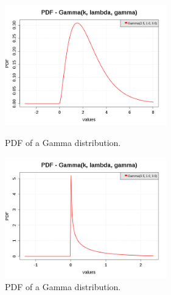 \begin{figure}[H]
  \begin{minipage}{10cm}
    \begin{center}
      \includegraphics[width=7cm]{pdf_Gamma_2.png}
      \caption{PDF of a Gamma distribution.}
      \label{PDFGamma2}
    \end{center}
  \end{minipage}
  \hfill
  \begin{minipage}{10cm}
    \begin{center}
      \includegraphics[width=7cm]{pdf_Gamma_3.png}
      \caption{PDF of a Gamma distribution.}
      \label{PDFGamma3}
    \end{center}
  \end{minipage}
\end{figure}




